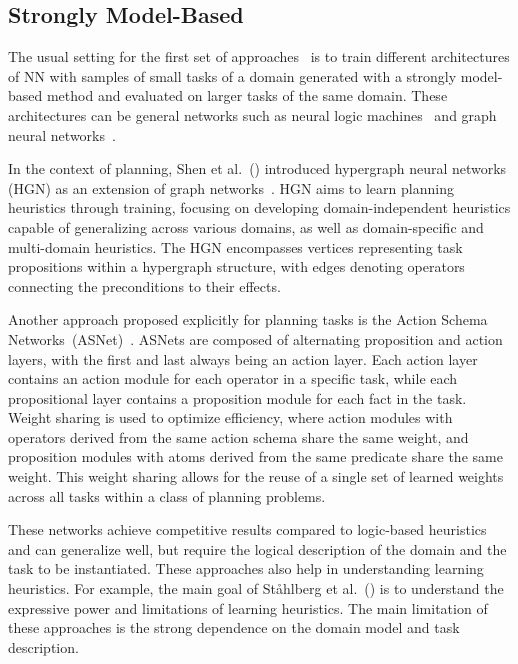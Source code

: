 \subsection{Strongly Model-Based}

The usual setting for the first set of approaches~\cite{Toyer.etal/2018,Shen.etal/2020,Toyer.etal/2020,Gehring.etal/2022,Stahlberg.etal/2022} is to train different architectures of NN with samples of small tasks of a domain generated with a strongly model-based method and evaluated on larger tasks of the same domain. These architectures can be general networks such as neural logic machines~\cite{Dong.etal/2018} and graph neural networks~\cite{Gori.etal/2005,Scarselli.etal/2008}.

In the context of planning, Shen et al.~(\citeyear{Shen.etal/2020}) introduced hypergraph neural networks (HGN) as an extension of graph networks~\cite{Battaglia.etal/2018}. HGN aims to learn planning heuristics through training, focusing on developing domain-independent heuristics capable of generalizing across various domains, as well as domain-specific and multi-domain heuristics. The HGN encompasses vertices representing task propositions within a hypergraph structure, with edges denoting operators connecting the preconditions to their effects.

Another approach proposed explicitly for planning tasks is the Action Schema Networks~(ASNet)~\cite{Toyer.etal/2018}. ASNets are composed of alternating proposition and action layers, with the first and last always being an action layer. Each action layer contains an action module for each operator in a specific task, while each propositional layer contains a proposition module for each fact in the task. Weight sharing is used to optimize efficiency, where action modules with operators derived from the same action schema share the same weight, and proposition modules with atoms derived from the same predicate share the same weight. This weight sharing allows for the reuse of a single set of learned weights across all tasks within a class of planning problems.

These networks achieve competitive results compared to logic-based heuristics and can generalize well, but require the logical description of the domain and the task to be instantiated. These approaches also help in understanding learning heuristics. For example, the main goal of St\aa hlberg et al.~(\citeyear{Stahlberg.etal/2022}) is to understand the expressive power and limitations of learning heuristics. The main limitation of these approaches is the strong dependence on the domain model and task description.

